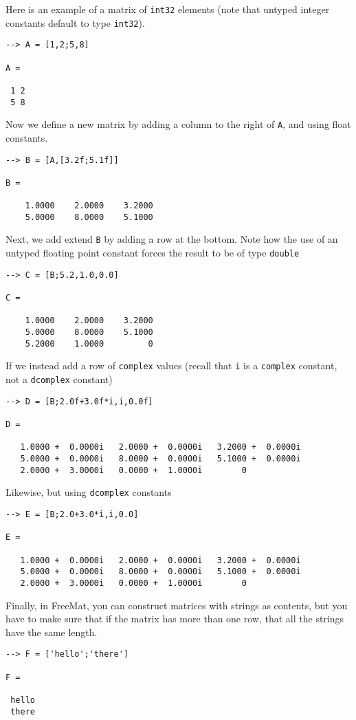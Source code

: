 Here is an example of a matrix of \verb|int32| elements (note that
untyped integer constants default to type \verb|int32|).
\begin{verbatim}
--> A = [1,2;5,8]

A = 

 1 2 
 5 8 
\end{verbatim}
Now we define a new matrix by adding a column to the right of
\verb|A|, and using float constants.
\begin{verbatim}
--> B = [A,[3.2f;5.1f]]

B = 

    1.0000    2.0000    3.2000 
    5.0000    8.0000    5.1000 
\end{verbatim}
Next, we add extend \verb|B| by adding a row at the bottom.  Note
how the use of an untyped floating point constant forces the
result to be of type \verb|double|
\begin{verbatim}
--> C = [B;5.2,1.0,0.0]

C = 

    1.0000    2.0000    3.2000 
    5.0000    8.0000    5.1000 
    5.2000    1.0000         0 
\end{verbatim}
If we instead add a row of \verb|complex| values (recall that \verb|i| is
a \verb|complex| constant, not a \verb|dcomplex| constant)
\begin{verbatim}
--> D = [B;2.0f+3.0f*i,i,0.0f]

D = 

   1.0000 +  0.0000i   2.0000 +  0.0000i   3.2000 +  0.0000i 
   5.0000 +  0.0000i   8.0000 +  0.0000i   5.1000 +  0.0000i 
   2.0000 +  3.0000i   0.0000 +  1.0000i        0           
\end{verbatim}
Likewise, but using \verb|dcomplex| constants
\begin{verbatim}
--> E = [B;2.0+3.0*i,i,0.0]

E = 

   1.0000 +  0.0000i   2.0000 +  0.0000i   3.2000 +  0.0000i 
   5.0000 +  0.0000i   8.0000 +  0.0000i   5.1000 +  0.0000i 
   2.0000 +  3.0000i   0.0000 +  1.0000i        0           
\end{verbatim}
Finally, in FreeMat, you can construct matrices with strings
as contents, but you have to make sure that if the matrix has
more than one row, that all the strings have the same length.
\begin{verbatim}
--> F = ['hello';'there']

F = 

 hello
 there
\end{verbatim}

